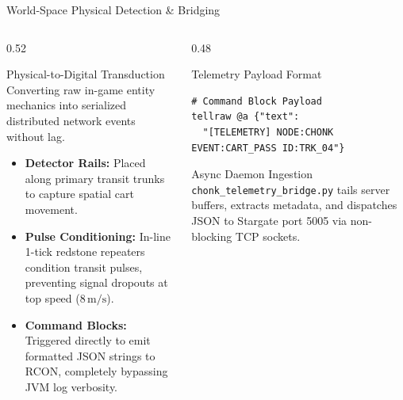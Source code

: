 \documentclass[aspectratio=169]{beamer}
\begin{document}
\begin{frame}[fragile]{World-Space Physical Detection \& Bridging}
	\begin{columns}[c]
		\begin{column}{0.52\textwidth}
			\begin{block}{Physical-to-Digital Transduction}
				Converting raw in-game entity mechanics into serialized distributed network events without lag.
			\end{block}
			\begin{itemize}
				\item \textbf{Detector Rails:} Placed along primary transit trunks to capture spatial cart movement.
				\item \textbf{Pulse Conditioning:} In-line 1-tick redstone repeaters condition transit pulses, preventing signal dropouts at top speed ($8\,\text{m/s}$).
				\item \textbf{Command Blocks:} Triggered directly to emit formatted JSON strings to RCON, completely bypassing JVM log verbosity.
			\end{itemize}
		\end{column}
		\begin{column}{0.48\textwidth}
			\begin{exampleblock}{Telemetry Payload Format}
\begin{lstlisting}
# Command Block Payload
tellraw @a {"text":
  "[TELEMETRY] NODE:CHONK EVENT:CART_PASS ID:TRK_04"}
\end{lstlisting}
			\end{exampleblock}
			\begin{block}{Async Daemon Ingestion}
				\texttt{chonk\_telemetry\_bridge.py} tails server buffers, extracts metadata, and dispatches JSON to Stargate port 5005 via non-blocking TCP sockets.
			\end{block}
		\end{column}
	\end{columns}
\end{frame}
\end{document}
